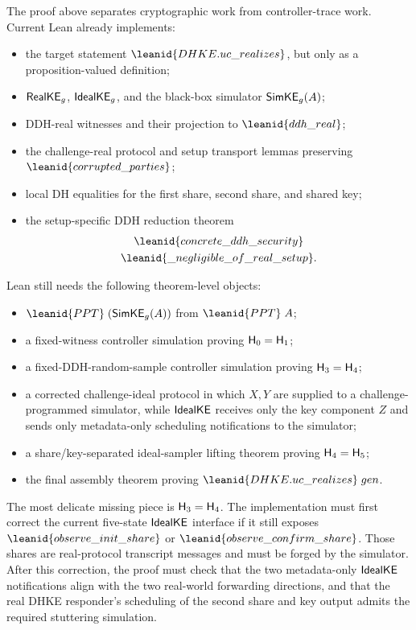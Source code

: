 \begin{obligation}
The proof above separates cryptographic work from controller-trace work.
Current Lean already implements:
\begin{itemize}
\item the target statement
\(\leanid{DHKE.uc\_realizes}\), but only as a proposition-valued definition;
\item \(\mathsf{RealKE}_g\), \(\mathsf{IdealKE}_g\), and the black-box simulator
\(\mathsf{SimKE}_g(A)\);
\item DDH-real witnesses and their projection to \(\leanid{ddh\_real}\);
\item the challenge-real protocol and setup transport lemmas preserving
\(\leanid{corrupted\_parties}\);
\item local DH equalities for the first share, second share, and shared key;
\item the setup-specific DDH reduction theorem
\[
\begin{gathered}
\leanid{concrete\_ddh\_security}\\
\leanid{\_negligible\_of\_real\_setup}.
\end{gathered}
\]
\end{itemize}
Lean still needs the following theorem-level objects:
\begin{itemize}
\item \(\leanid{PPT}\;(\SimKE_g(A))\) from \(\leanid{PPT}\;A\);
\item a fixed-witness controller simulation proving
\(\mathsf{H}_0=\mathsf{H}_1\);
\item a fixed-DDH-random-sample controller simulation proving
\(\mathsf{H}_3=\mathsf{H}_4\);
\item a corrected challenge-ideal protocol in which \(X,Y\) are supplied to a
challenge-programmed simulator, while \(\mathsf{IdealKE}\) receives only the key
component \(Z\) and sends only metadata-only scheduling notifications to the
simulator;
\item a share/key-separated ideal-sampler lifting theorem proving
\(\mathsf{H}_4=\mathsf{H}_5\);
\item the final assembly theorem proving \(\leanid{DHKE.uc\_realizes}\;gen\).
\end{itemize}
The most delicate missing piece is \(\mathsf{H}_3=\mathsf{H}_4\).  The implementation must
first correct the current five-state \(\mathsf{IdealKE}\) interface if it still exposes
\(\leanid{observe\_init\_share}\) or
\(\leanid{observe\_confirm\_share}\).  Those shares are real-protocol transcript
messages and must be forged by the simulator.  After this correction, the proof
must check that the two metadata-only \(\mathsf{IdealKE}\) notifications align with the
two real-world forwarding directions, and that the real DHKE responder's
scheduling of the second share and key output admits the required stuttering
simulation.
\end{obligation}

